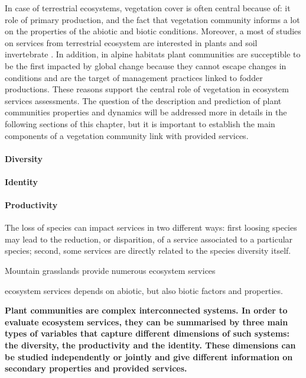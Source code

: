 In case of terrestrial ecosystems, vegetation cover is often central because of: it role of primary production, and the fact that vegetation community informs a lot on the properties of the abiotic and biotic conditions. Moreover, a most of studies on services from terrestrial ecosystem are interested in plants and soil invertebrate \cite{de_bello_towards_2010}. In addition, in alpine habitats plant communities are succeptible to be the first impacted by global change because they cannot escape changes in conditions and are the target of management practices linked to fodder productions. These reasons support the central role of vegetation in ecosystem services assessments. The question of the description and prediction of plant communities properties and dynamics will be addressed more in details in the following sections of this chapter, but it is important to establish the main components of a vegetation community link with provided services.


\paragraph{Diversity}


\paragraph{Identity}

\paragraph{Productivity}
The loss of species can impact services in two different ways: first loosing species may lead to the reduction, or disparition, of a service associated to a particular species; second, some services are directly related to the species diversity itself.

Mountain grasslands provide numerous ecosystem services 

ecosystem services depends on abiotic, but also biotic factors and properties. 

%

\textbf{Plant communities are complex interconnected systems. In order to evaluate ecosystem services, they can be summarised by three main types of variables that capture different dimensions of such systems: the diversity, the productivity and the identity. These dimensions can be studied independently or jointly and give different information on secondary properties and provided services.}


